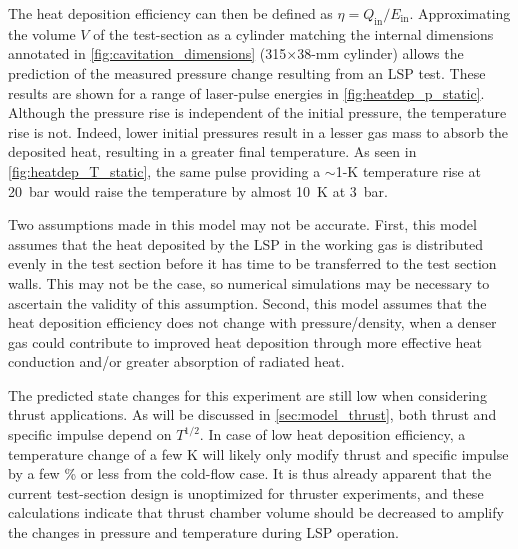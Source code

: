                 The heat deposition efficiency can then be defined as $\eta = Q_\mathrm{in}/E_\mathrm{in}$. Approximating the volume $V$ of the test-section as a cylinder matching the internal dimensions annotated in \autoref{fig:cavitation_dimensions} (315$\times$38-\unit{mm} cylinder) allows the prediction of the measured pressure change resulting from an LSP test. These results are shown for a range of laser-pulse energies in \autoref{fig:heatdep_p_static}. Although the pressure rise is independent of the initial pressure, the temperature rise is not. Indeed, lower initial pressures result in a lesser gas mass to absorb the deposited heat, resulting in a greater final temperature. As seen in \autoref{fig:heatdep_T_static}, the same pulse providing a $\sim$1-K temperature rise at \qty{20}{bar} would raise the temperature by almost \qty{10}{K} at \qty{3}{bar}.

                Two assumptions made in this model may not be accurate. First, this model assumes that the heat deposited by the LSP in the working gas is distributed evenly in the test section before it has time to be transferred to the test section walls. This may not be the case, so numerical simulations may be necessary to ascertain the validity of this assumption. Second, this model assumes that the heat deposition efficiency does not change with pressure/density, when a denser gas could contribute to improved heat deposition through more effective heat conduction and/or greater absorption of radiated heat.

                The predicted state changes for this experiment are still low when considering thrust applications. As will be discussed in \autoref{sec:model_thrust}, both thrust and specific impulse depend on $T^{1/2}$. In case of low heat deposition efficiency, a temperature change of a few K will likely only modify thrust and specific impulse by a few \% or less from the cold-flow case. It is thus already apparent that the current test-section design is unoptimized for thruster experiments, and these calculations indicate that thrust chamber volume should be decreased to amplify the changes in pressure and temperature during LSP operation.

